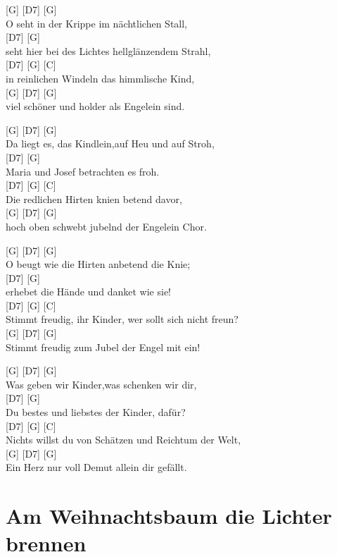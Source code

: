 \documentclass[
  letterpaper,
]{scrbook}
\begin{document}
{[}G{]} {[}D7{]} {[}G{]}\\
O seht in der Krippe im nächtlichen Stall,\\
{[}D7{]} {[}G{]}\\
seht hier bei des Lichtes hellglänzendem Strahl,\\
{[}D7{]} {[}G{]} {[}C{]}\\
in reinlichen Windeln das himmlische Kind,\\
{[}G{]} {[}D7{]} {[}G{]}\\
viel schöner und holder als Engelein sind.

{[}G{]} {[}D7{]} {[}G{]}\\
Da liegt es, das Kindlein,auf Heu und auf Stroh,\\
{[}D7{]} {[}G{]}\\
Maria und Josef betrachten es froh.\\
{[}D7{]} {[}G{]} {[}C{]}\\
Die redlichen Hirten knien betend davor,\\
{[}G{]} {[}D7{]} {[}G{]}\\
hoch oben schwebt jubelnd der Engelein Chor.

{[}G{]} {[}D7{]} {[}G{]}\\
O beugt wie die Hirten anbetend die Knie;\\
{[}D7{]} {[}G{]}\\
erhebet die Hände und danket wie sie!\\
{[}D7{]} {[}G{]} {[}C{]}\\
Stimmt freudig, ihr Kinder, wer sollt\textquotesingle{} sich nicht
freun?\\
{[}G{]} {[}D7{]} {[}G{]}\\
Stimmt freudig zum Jubel der Engel mit ein!

{[}G{]} {[}D7{]} {[}G{]}\\
Was geben wir Kinder,was schenken wir dir,\\
{[}D7{]} {[}G{]}\\
Du bestes und liebstes der Kinder, dafür?\\
{[}D7{]} {[}G{]} {[}C{]}\\
Nichts willst du von Schätzen und Reichtum der Welt,\\
{[}G{]} {[}D7{]} {[}G{]}\\
Ein Herz nur voll Demut allein dir gefällt.

\hypertarget{am-weihnachtsbaum-die-lichter-brennen}{%
\chapter{Am Weihnachtsbaum die Lichter
brennen}\label{am-weihnachtsbaum-die-lichter-brennen}}
\end{document}
